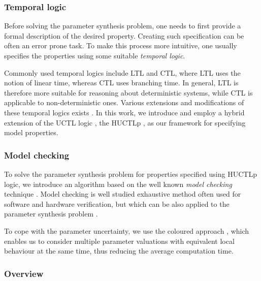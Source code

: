 
\subsubsection{\textbf{Temporal logic}}

Before solving the parameter synthesis problem, one needs to first provide a formal description of the desired property. Creating such specification can be often an error prone task. To make this process more intuitive, one usually specifies the properties using some suitable \emph{temporal logic}. 


Commonly used temporal logics include \acf{LTL} and \acf{CTL}, where \ac{LTL} uses the notion of linear time, whereas \ac{CTL} uses branching time. In general, \ac{LTL} is therefore more suitable for reasoning about deterministic systems, while \ac{CTL} is applicable to non-deterministic ones. Various extensions and modifications of these temporal logics exists \cite{ext2, huctl, ext1}. In this work, we introduce and employ a hybrid extension of the UCTL logic \cite{uctl}, the \acf{HUCTLp} \cite{fm2016}, as our framework for specifying model properties.

\subsubsection{\textbf{Model checking}}

To solve the parameter synthesis problem for properties specified using \ac{HUCTLp} logic, we introduce an algorithm based on the well known \emph{model checking} technique \cite{clarke}. Model checking is well studied  exhaustive method often used for software and hardware verification, but which can be also applied to the parameter synthesis problem \cite{batt, gilbert, donze, jha}.

To cope with the parameter uncertainty, we use the coloured approach \cite{ieee, ATVA}, which enables us to consider multiple parameter valuations with equivalent local behaviour at the same time, thus reducing the average computation time.

\subsubsection{\textbf{Overview}}
 
